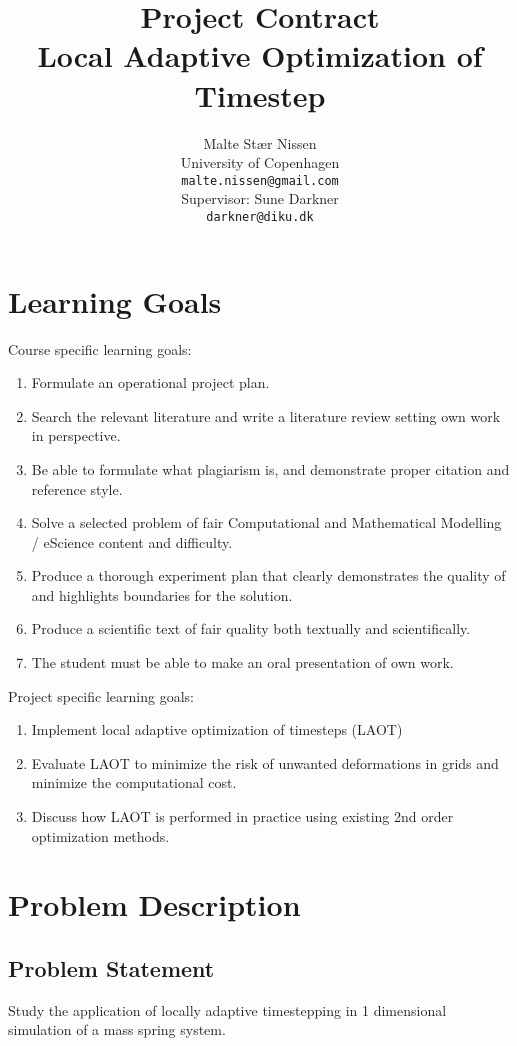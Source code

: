 \documentclass[11pt,a4paper]{article}
\title{Project Contract\\Local Adaptive Optimization of Timestep}
\author{Malte Stær Nissen\\University of Copenhagen\\\texttt{malte.nissen@gmail.com}\\Supervisor: Sune Darkner\\\texttt{darkner@diku.dk}}
\begin{document}
\maketitle

\section{Learning Goals}
Course specific learning goals:
\begin{enumerate}
	\item Formulate an operational project plan.
	\item Search the relevant literature and write a literature review setting own work in perspective.
	\item Be able to formulate what plagiarism is, and demonstrate proper citation and reference style.
	\item Solve a selected problem of fair Computational and Mathematical Modelling / eScience content and difficulty.
	\item Produce a thorough experiment plan that clearly demonstrates the quality of and highlights boundaries for the solution. 
	\item Produce a scientific text of fair quality both textually and scientifically.
	\item The student must be able to make an oral presentation of own work.
\end{enumerate}
Project specific learning goals:
\begin{enumerate}
    \item Implement local adaptive optimization of timesteps (LAOT)
	\item Evaluate LAOT to minimize the risk of unwanted deformations in grids
        and minimize the computational cost.
    \item Discuss how LAOT is performed in practice using existing 2nd order optimization methods.
\end{enumerate}

\section{Problem Description}

\subsection{Problem Statement}
Study the application of locally adaptive timestepping in 1 dimensional
simulation of a mass spring system.
\end{document}
